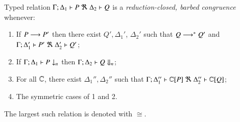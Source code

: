\documentclass[runningheads]{llncs}
\begin{document}

\begin{definition}
\label{def:rc}
	Typed relation
	$\horel{\Gamma}{\Delta_1}{P}{\ \Re\ }{\Delta_2}{Q}$
	is a {\em reduction-closed, barbed congruence} whenever:
	\begin{enumerate}[1)]
		\item	If $P \longrightarrow P'$ then there exist $Q', \Delta_1'$,  $\Delta_2'$ such that $Q \longrightarrow^* Q'$ and
			$\horel{\Gamma}{\Delta_1'}{P'}{\ \Re\ }{\Delta_2'}{Q'}$; 

			\item	If $\Gamma;\Delta_1 \vdash P \downarrow_{n}$ then $\Gamma;\Delta_2 \vdash Q \Downarrow_{n}$; %


		\item	For all ${\Bbb C}$, there exist $\Delta_1'',\Delta_2''$ such that  $\horel{\Gamma}{\Delta_1''}{\context{\C}{P}}{\ \Re\ }{\Delta_2''}{\context{\C}{Q}}$;
		                      \item	The symmetric cases of 1 and 2.                
	\end{enumerate}
	The largest such relation is denoted with $\cong$.
\end{definition}
\end{document}
